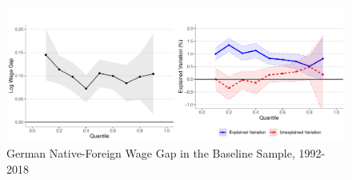 

\begin{figure}[H]
	\centering
			\includegraphics[scale=0.65]{nfgap}
			\caption{German Native-Foreign Wage Gap in the Baseline Sample, 1992-2018 \label{fig:wage_gap_base}}
\end{figure}

